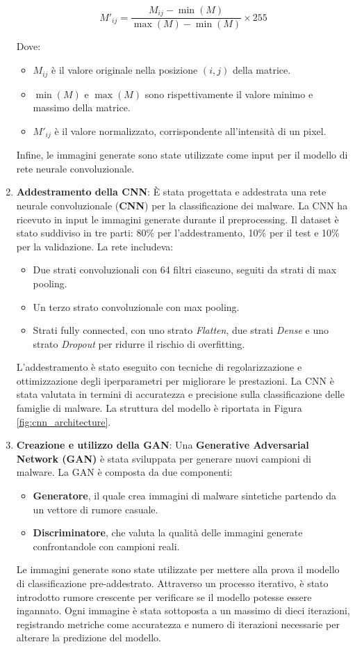 \begin{enumerate}
    \[
    M'_{ij} = \frac{M_{ij} - \min(M)}{\max(M) - \min(M)} \times 255
    \]

    Dove:
    \begin{itemize}
        \item \( M_{ij} \) è il valore originale nella posizione \( (i, j) \) della matrice.
        \item \( \min(M) \) e \( \max(M) \) sono rispettivamente il valore minimo e massimo della matrice.
        \item \( M'_{ij} \) è il valore normalizzato, corrispondente all'intensità di un pixel.
    \end{itemize}

    Infine, le immagini generate sono state utilizzate come input per il modello di rete neurale convoluzionale.

    \item \textbf{Addestramento della CNN}: 
    È stata progettata e addestrata una rete neurale convoluzionale (\textbf{CNN}) per la classificazione dei malware. La CNN ha ricevuto in input le immagini generate durante il preprocessing. Il dataset è stato suddiviso in tre parti: 80\% per l'addestramento, 10\% per il test e 10\% per la validazione. La rete includeva:
    \begin{itemize}
        \item Due strati convoluzionali con 64 filtri ciascuno, seguiti da strati di max pooling.
        \item Un terzo strato convoluzionale con max pooling.
        \item Strati fully connected, con uno strato \textit{Flatten}, due strati \textit{Dense} e uno strato \textit{Dropout} per ridurre il rischio di overfitting.
    \end{itemize}
    L'addestramento è stato eseguito con tecniche di regolarizzazione e ottimizzazione degli iperparametri per migliorare le prestazioni. La CNN è stata valutata in termini di accuratezza e precisione sulla classificazione delle famiglie di malware. La struttura del modello è riportata in Figura \ref{fig:cnn_architecture}.

    \item \textbf{Creazione e utilizzo della GAN}: 
    Una \textbf{Generative Adversarial Network (GAN)} è stata sviluppata per generare nuovi campioni di malware. La GAN è composta da due componenti:
    \begin{itemize}
        \item \textbf{Generatore}, il quale crea immagini di malware sintetiche partendo da un vettore di rumore casuale.
        \item \textbf{Discriminatore}, che valuta la qualità delle immagini generate confrontandole con campioni reali.
    \end{itemize}
    Le immagini generate sono state utilizzate per mettere alla prova il modello di classificazione pre-addestrato. Attraverso un processo iterativo, è stato introdotto rumore crescente per verificare se il modello potesse essere ingannato. Ogni immagine è stata sottoposta a un massimo di dieci iterazioni, registrando metriche come accuratezza e numero di iterazioni necessarie per alterare la predizione del modello.


\end{enumerate}
